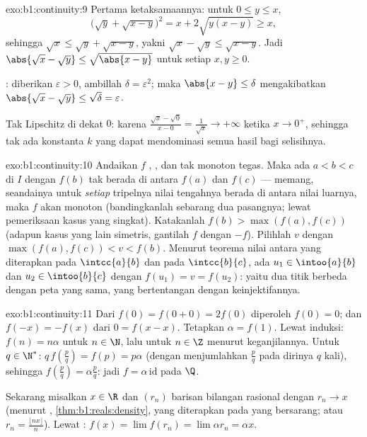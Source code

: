 \begin{solution}{exo:b1:continuity:9}
Pertama ketaksamaannya: untuk $0 \leq y \leq x$,
\[
\bigl(\sqrt y + \sqrt{x - y}\bigr)^2 = x + 2\sqrt{y(x-y)} \geq x,
\]
sehingga $\sqrt x \leq \sqrt y + \sqrt{x - y}$, yakni $\sqrt x - \sqrt y
\leq \sqrt{x - y}$. Jadi $\abs{\sqrt x - \sqrt y} \leq
\sqrt{\abs{x - y}}$ untuk setiap $x, y \geq 0$.

: diberikan $\varepsilon > 0$, ambillah $\delta =
\varepsilon^2$; maka $\abs{x - y} \leq \delta$ mengakibatkan $\abs{\sqrt x
- \sqrt y} \leq \sqrt\delta = \varepsilon$.

Tak Lipschitz di dekat $0$: karena $\frac{\sqrt x - \sqrt 0}{x - 0} =
\frac{1}{\sqrt x} \to +\infty$ ketika $x \to 0^+$, sehingga tak ada konstanta $k$
yang dapat mendominasi semua hasil bagi selisihnya.
\end{solution}

\begin{solution}{exo:b1:continuity:10}
Andaikan $f$ , , dan tak monoton tegas.
Maka ada $a < b < c$ di $I$ dengan $f(b)$ tak berada di antara $f(a)$ dan
$f(c)$ --- memang, seandainya untuk \emph{setiap} tripelnya nilai tengahnya berada
di antara nilai luarnya, maka $f$ akan monoton (bandingkanlah sebarang dua
pasangnya; lewat pemeriksaan kasus yang singkat). Katakanlah $f(b) > \max(f(a), f(c))$ (adapun kasus
yang lain simetris, gantilah $f$ dengan $-f$). Pilihlah $v$ dengan $\max(f(a),
f(c)) < v < f(b)$. Menurut teorema nilai antara yang diterapkan pada
$\intcc{a}{b}$ dan pada $\intcc{b}{c}$, ada $u_1 \in
\intoo{a}{b}$ dan $u_2 \in \intoo{b}{c}$ dengan $f(u_1) = v = f(u_2)$:
yaitu dua titik berbeda dengan peta yang sama, yang bertentangan dengan keinjektifannya.
\end{solution}

\begin{solution}{exo:b1:continuity:11}
Dari $f(0) = f(0+0) = 2f(0)$ diperoleh $f(0) = 0$; dan $f(-x) = -f(x)$ dari $0 =
f(x - x)$. Tetapkan $\alpha = f(1)$. Lewat induksi: $f(n) = n\alpha$ untuk $n
\in \N$, lalu untuk $n \in \Z$ menurut keganjilannya. Untuk $q \in \N^*$:
$q\,f(\frac pq) = f(p) = p\alpha$ (dengan menjumlahkan $\frac pq$ pada dirinya $q$
kali), sehingga $f(\frac pq) = \alpha\frac pq$: jadi $f = \alpha\,
\mathrm{id}$ pada $\Q$.

Sekarang misalkan $x \in \R$ dan $(r_n)$ barisan bilangan rasional dengan $r_n \to
x$ (menurut , \cref{thm:b1:reals:density}, yang diterapkan pada 
yang bersarang; atau $r_n = \frac{\lfloor nx\rfloor}{n}$). Lewat :
$f(x) = \lim f(r_n) = \lim \alpha r_n = \alpha x$.
\end{solution}

